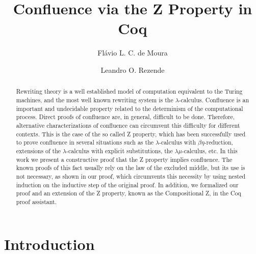 \documentclass{llncs}
\title{Confluence via the Z Property in Coq}
\author{Flávio L. C. de Moura \and Leandro O. Rezende}
\institute{Departamento de Ciência da Computação, Universidade de Brasília, Brazil\\
\email{flaviomoura@unb.br,l-ordo.ab.chao@hotmail.com}}
\begin{document}
\maketitle
  
\begin{abstract}
  Rewriting theory is a well established model of computation
  equivalent to the Turing machines, and the most well known rewriting
  system is the $\lambda$-calculus. Confluence is an important and
  undecidable property related to the determinism of the computational
  process. Direct proofs of confluence are, in general, difficult to
  be done. Therefore, alternative characterizations of confluence can
  circumvent this difficulty for different contexts. This is the case
  of the so called Z property, which has been successfully used to
  prove confluence in several situations such as the
  $\lambda$-calculus with $\beta\eta$-reduction, extensions of the
  $\lambda$-calculus with explicit substitutions, the
  $\lambda\mu$-calculus, etc. In this work we present a constructive
  proof that the Z property implies confluence. The known proofs of
  this fact usually rely on the law of the excluded middle, but its use is not necessary, 
  as shown in our proof, which circumvents this necessity by using nested induction 
  on the inductive step of the original proof. 
  In addition, we formalized our proof and an extension of the Z
  property, known as the Compositional Z, in the Coq proof assistant.
\end{abstract}


\section{Introduction}
\end{document}
